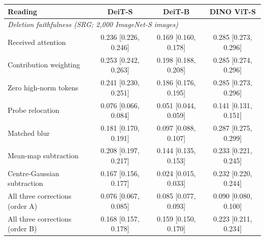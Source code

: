 \footnotesize
\setlength{\tabcolsep}{4pt}
\begin{tabular}{lccc}
\toprule
Reading & DeiT-S & DeiT-B & DINO ViT-S \\
\midrule
\multicolumn{4}{l}{\emph{Deletion faithfulness (SRG; 2,000 ImageNet-S images)}} \\
\addlinespace[1pt]
Received attention & 0.236 {\scriptsize [0.226, 0.246]} & 0.169 {\scriptsize [0.160, 0.178]} & 0.285 {\scriptsize [0.273, 0.296]} \\
Contribution weighting & 0.253 {\scriptsize [0.242, 0.263]} & 0.198 {\scriptsize [0.188, 0.208]} & 0.285 {\scriptsize [0.274, 0.296]} \\
\quad Zero high-norm tokens & 0.241 {\scriptsize [0.230, 0.251]} & 0.186 {\scriptsize [0.176, 0.195]} & 0.285 {\scriptsize [0.273, 0.296]} \\
Probe relocation & 0.076 {\scriptsize [0.066, 0.084]} & 0.051 {\scriptsize [0.044, 0.059]} & 0.141 {\scriptsize [0.131, 0.151]} \\
\quad Matched blur & 0.181 {\scriptsize [0.170, 0.191]} & 0.097 {\scriptsize [0.088, 0.107]} & 0.287 {\scriptsize [0.275, 0.299]} \\
Mean-map subtraction & 0.208 {\scriptsize [0.197, 0.217]} & 0.144 {\scriptsize [0.135, 0.153]} & 0.233 {\scriptsize [0.221, 0.245]} \\
\quad Centre-Gaussian subtraction & 0.167 {\scriptsize [0.156, 0.177]} & 0.024 {\scriptsize [0.015, 0.033]} & 0.232 {\scriptsize [0.220, 0.244]} \\
All three corrections (order A) & 0.076 {\scriptsize [0.067, 0.085]} & 0.085 {\scriptsize [0.077, 0.093]} & 0.090 {\scriptsize [0.080, 0.100]} \\
All three corrections (order B) & 0.168 {\scriptsize [0.157, 0.178]} & 0.159 {\scriptsize [0.150, 0.170]} & 0.223 {\scriptsize [0.211, 0.234]} \\

\end{tabular}
